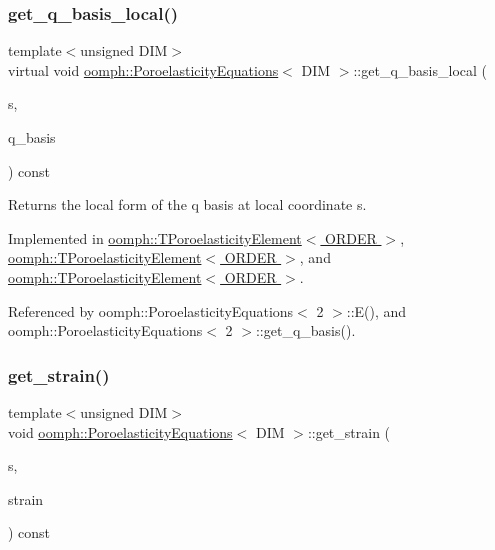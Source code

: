 \subsubsection{\texorpdfstring{get\+\_\+q\+\_\+basis\+\_\+local()}{get\_q\_basis\_local()}}
{\footnotesize\ttfamily template$<$unsigned D\+IM$>$ \\
virtual void \hyperlink{classoomph_1_1PoroelasticityEquations}{oomph\+::\+Poroelasticity\+Equations}$<$ D\+IM $>$\+::get\+\_\+q\+\_\+basis\+\_\+local (\begin{DoxyParamCaption}\item[{const \hyperlink{classoomph_1_1Vector}{Vector}$<$ double $>$ \&}]{s,  }\item[{\hyperlink{classoomph_1_1Shape}{Shape} \&}]{q\+\_\+basis }\end{DoxyParamCaption}) const\hspace{0.3cm}{\ttfamily [pure virtual]}}



Returns the local form of the q basis at local coordinate s. 



Implemented in \hyperlink{classoomph_1_1TPoroelasticityElement_aa432c3fedc655e17ee0e62d6d594eeaa}{oomph\+::\+T\+Poroelasticity\+Element$<$ O\+R\+D\+E\+R $>$}, \hyperlink{classoomph_1_1TPoroelasticityElement_a89c64563c231e0a2ec05212c93c0adec}{oomph\+::\+T\+Poroelasticity\+Element$<$ O\+R\+D\+E\+R $>$}, and \hyperlink{classoomph_1_1TPoroelasticityElement_aeda8ff5b06e401e02516365f2e43003b}{oomph\+::\+T\+Poroelasticity\+Element$<$ O\+R\+D\+E\+R $>$}.



Referenced by oomph\+::\+Poroelasticity\+Equations$<$ 2 $>$\+::\+E(), and oomph\+::\+Poroelasticity\+Equations$<$ 2 $>$\+::get\+\_\+q\+\_\+basis().

\mbox{\label{classoomph_1_1PoroelasticityEquations_aea601e7d1bc0757b9effa9dcdbfa0617}} 
\subsubsection{\texorpdfstring{get\+\_\+strain()}{get\_strain()}}
{\footnotesize\ttfamily template$<$unsigned D\+IM$>$ \\
void \hyperlink{classoomph_1_1PoroelasticityEquations}{oomph\+::\+Poroelasticity\+Equations}$<$ D\+IM $>$\+::get\+\_\+strain (\begin{DoxyParamCaption}\item[{const \hyperlink{classoomph_1_1Vector}{Vector}$<$ double $>$ \&}]{s,  }\item[{\hyperlink{classoomph_1_1DenseMatrix}{Dense\+Matrix}$<$ double $>$ \&}]{strain }\end{DoxyParamCaption}) const}



